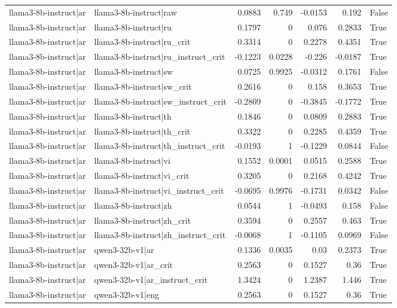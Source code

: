 \begin{table}
\begin{tabular}{l l r r r r l}
llama3-8b-instruct|ar & llama3-8b-instruct|raw & 0.0883 & 0.749 & -0.0153 & 0.192 & False \\
llama3-8b-instruct|ar & llama3-8b-instruct|ru & 0.1797 & 0 & 0.076 & 0.2833 & True \\
llama3-8b-instruct|ar & llama3-8b-instruct|ru_crit & 0.3314 & 0 & 0.2278 & 0.4351 & True \\
llama3-8b-instruct|ar & llama3-8b-instruct|ru_instruct_crit & -0.1223 & 0.0228 & -0.226 & -0.0187 & True \\
llama3-8b-instruct|ar & llama3-8b-instruct|sw & 0.0725 & 0.9925 & -0.0312 & 0.1761 & False \\
llama3-8b-instruct|ar & llama3-8b-instruct|sw_crit & 0.2616 & 0 & 0.158 & 0.3653 & True \\
llama3-8b-instruct|ar & llama3-8b-instruct|sw_instruct_crit & -0.2809 & 0 & -0.3845 & -0.1772 & True \\
llama3-8b-instruct|ar & llama3-8b-instruct|th & 0.1846 & 0 & 0.0809 & 0.2883 & True \\
llama3-8b-instruct|ar & llama3-8b-instruct|th_crit & 0.3322 & 0 & 0.2285 & 0.4359 & True \\
llama3-8b-instruct|ar & llama3-8b-instruct|th_instruct_crit & -0.0193 & 1 & -0.1229 & 0.0844 & False \\
llama3-8b-instruct|ar & llama3-8b-instruct|vi & 0.1552 & 0.0001 & 0.0515 & 0.2588 & True \\
llama3-8b-instruct|ar & llama3-8b-instruct|vi_crit & 0.3205 & 0 & 0.2168 & 0.4242 & True \\
llama3-8b-instruct|ar & llama3-8b-instruct|vi_instruct_crit & -0.0695 & 0.9976 & -0.1731 & 0.0342 & False \\
llama3-8b-instruct|ar & llama3-8b-instruct|zh & 0.0544 & 1 & -0.0493 & 0.158 & False \\
llama3-8b-instruct|ar & llama3-8b-instruct|zh_crit & 0.3594 & 0 & 0.2557 & 0.463 & True \\
llama3-8b-instruct|ar & llama3-8b-instruct|zh_instruct_crit & -0.0068 & 1 & -0.1105 & 0.0969 & False \\
llama3-8b-instruct|ar & qwen3-32b-v1|ar & 0.1336 & 0.0035 & 0.03 & 0.2373 & True \\
llama3-8b-instruct|ar & qwen3-32b-v1|ar_crit & 0.2563 & 0 & 0.1527 & 0.36 & True \\
llama3-8b-instruct|ar & qwen3-32b-v1|ar_instruct_crit & 1.3424 & 0 & 1.2387 & 1.446 & True \\
llama3-8b-instruct|ar & qwen3-32b-v1|eng & 0.2563 & 0 & 0.1527 & 0.36 & True \\

\end{tabular}
\end{table}
